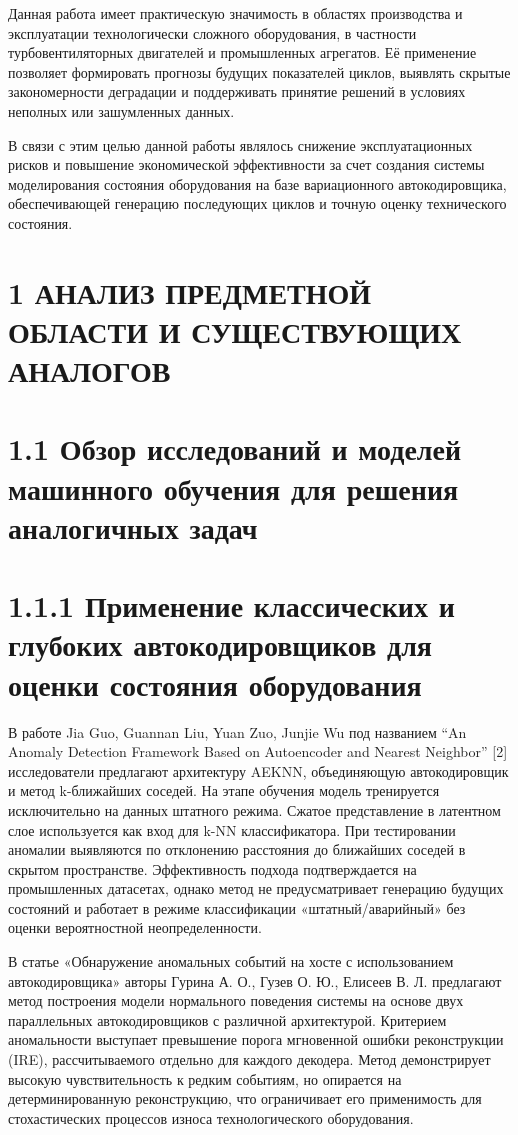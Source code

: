 \documentclass[14pt, a4paper, oneside]{extreport}
\begin{document}
Данная работа имеет практическую значимость в областях производства и эксплуатации технологически сложного оборудования, в частности турбовентиляторных двигателей и промышленных агрегатов. Её применение позволяет формировать прогнозы будущих показателей циклов, выявлять скрытые закономерности деградации и поддерживать принятие решений в условиях неполных или зашумленных данных.

В связи с этим целью данной работы являлось снижение эксплуатационных рисков и повышение экономической эффективности за счет создания системы моделирования состояния оборудования на базе вариационного автокодировщика, обеспечивающей генерацию последующих циклов и точную оценку технического состояния.

\clearpage



\section{1 АНАЛИЗ ПРЕДМЕТНОЙ ОБЛАСТИ И СУЩЕСТВУЮЩИХ АНАЛОГОВ}
\section{1.1 Обзор исследований и моделей машинного обучения для решения аналогичных задач}
\section{1.1.1 Применение классических и глубоких автокодировщиков для оценки состояния оборудования}
\vspace{1em}
В работе Jia Guo, Guannan Liu, Yuan Zuo, Junjie Wu под названием “An Anomaly Detection Framework Based on Autoencoder and Nearest Neighbor” [2] исследователи предлагают архитектуру AEKNN, объединяющую автокодировщик и метод k-ближайших соседей. На этапе обучения модель тренируется исключительно на данных штатного режима. Сжатое представление в латентном слое используется как вход для k-NN классификатора. При тестировании аномалии выявляются по отклонению расстояния до ближайших соседей в скрытом пространстве. Эффективность подхода подтверждается на промышленных датасетах, однако метод не предусматривает генерацию будущих состояний и работает в режиме классификации «штатный/аварийный» без оценки вероятностной неопределенности.

В статье «Обнаружение аномальных событий на хосте с использованием автокодировщика» авторы Гурина А. О., Гузев О. Ю., Елисеев В. Л. предлагают метод построения модели нормального поведения системы на основе двух параллельных автокодировщиков с различной архитектурой. Критерием аномальности выступает превышение порога мгновенной ошибки реконструкции (IRE), рассчитываемого отдельно для каждого декодера. Метод демонстрирует высокую чувствительность к редким событиям, но опирается на детерминированную реконструкцию, что ограничивает его применимость для стохастических процессов износа технологического оборудования.
\end{document}
